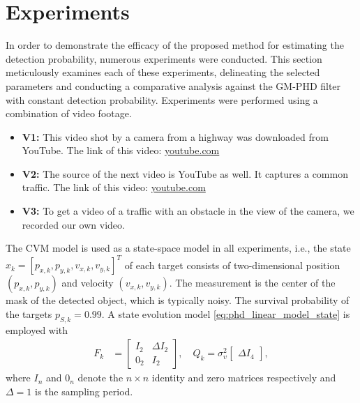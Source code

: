 \chapter{Experiments}
\label{sec:experiments}
In order to demonstrate the efficacy of the proposed method for estimating the detection probability, numerous experiments were conducted. This section meticulously examines each of these experiments, delineating the selected parameters and conducting a comparative analysis against the GM-PHD filter with constant detection probability.
Experiments were performed using a combination of video footage.
\begin{itemize}
  \item \textbf{V1:} This video shot by a camera from a highway was downloaded from YouTube. The link of this video: \href{https://www.youtube.com/watch?v=KBsqQez-O4w&t=30s&ab_channel=NickMartinez}{youtube.com}
  \item \textbf{V2:} The source of the next video is YouTube as well. It captures a common traffic. The link of this
  video: \href{https://www.youtube.com/watch?v=7WFYiZersNc&ab_channel=AbdulMunaim}{youtube.com}
  \item \textbf{V3:} To get a video of a traffic with an obstacle in the view of the camera, we recorded our own video.
\end{itemize}
 The CVM model is used as a state-space model in all experiments, i.e., the state $x_k = [p_{x
,k},
p_{y
,k},v_{x
,k},v_{y,
k}]^T$ of each target consists of two-dimensional position $(p_{x,k},p_{y,k})$ and velocity $(v_{x,k},v_{y,k})$. The measurement is the center of the mask of the detected object, which is typically noisy. The survival probability of the targets $p_{S,k} = 0.99$. A state evolution model \eqref{eq:phd_linear_model_state} is employed with
\begin{align}
  F_k &=
  \begin{bmatrix}
    I_2 & \Delta I_2 \\
    0_2 & I_2
  \end{bmatrix},
  \quad
  Q_k = \sigma_{\upsilon}^2
  \begin{bmatrix}
    \Delta I_4
  \end{bmatrix},
\end{align}
where $I_n$ and $0_n$ denote the $n\times n$ identity and zero matrices respectively and $\Delta = 1$ is the sampling
period.

